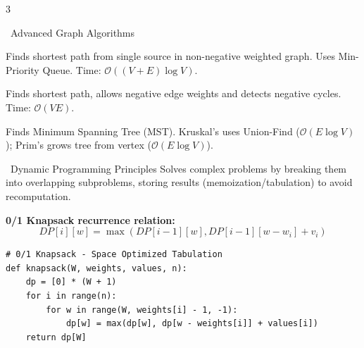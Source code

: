 \documentclass[10pt,landscape,letterpaper]{article}
\begin{document}
\begin{multicols*}{3}
\begin{accentbox}{\faNetworkWired~Advanced Graph Algorithms}
  \scriptsize
  \begin{description}[leftmargin=3pt,itemsep=2pt,topsep=2pt,parsep=0pt]
    \item[\color{primary}Dijkstra's Algorithm:] Finds shortest path from single source in non-negative weighted graph. Uses Min-Priority Queue. Time: $\mathcal{O}((V + E)\log V)$.
    \item[\color{primary}Bellman-Ford:] Finds shortest path, allows negative edge weights and detects negative cycles. Time: $\mathcal{O}(VE)$.
    \item[\color{primary}Prim's \& Kruskal's:] Finds Minimum Spanning Tree (MST). Kruskal's uses Union-Find ($\mathcal{O}(E\log V)$); Prim's grows tree from vertex ($\mathcal{O}(E\log V)$).
  \end{description}
\end{accentbox}

\begin{topicbox}{\faBrain~Dynamic Programming Principles}
  \scriptsize
  Solves complex problems by breaking them into overlapping subproblems, storing results (memoization/tabulation) to avoid recomputation.
  \vspace{2pt}
  
  \textbf{0/1 Knapsack recurrence relation:}
  \[ DP[i][w] = \max(DP[i-1][w], DP[i-1][w-w_i] + v_i) \]
  
  \begin{lstlisting}
# 0/1 Knapsack - Space Optimized Tabulation
def knapsack(W, weights, values, n):
    dp = [0] * (W + 1)
    for i in range(n):
        for w in range(W, weights[i] - 1, -1):
            dp[w] = max(dp[w], dp[w - weights[i]] + values[i])
    return dp[W]
  \end{lstlisting}
\end{topicbox}

\columnbreak


\end{multicols*}
\end{document}
